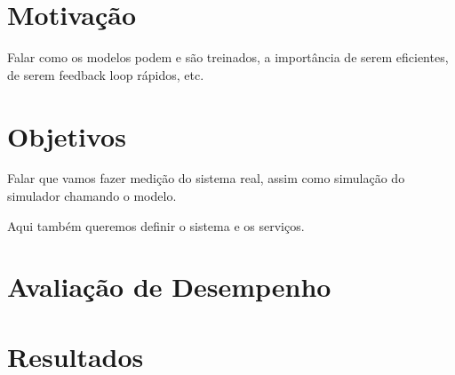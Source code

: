 \section{Motivação}%

Falar como os modelos podem e são treinados, a importância de serem eficientes, de serem feedback loop rápidos, etc.

\section{Objetivos}%

Falar que vamos fazer medição do sistema real, assim como simulação do simulador chamando o modelo.

Aqui também queremos definir o sistema e os serviços.

\section{Avaliação de Desempenho}%

\section{Resultados}%

